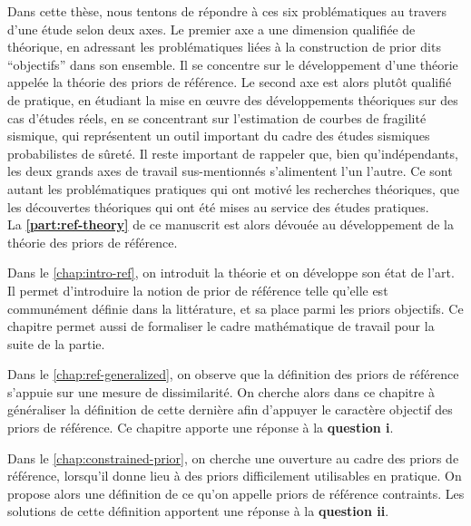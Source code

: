 Dans cette thèse, nous tentons de répondre à ces six problématiques au travers d'une étude selon deux axes. Le premier axe a une dimension qualifiée de théorique, en adressant les problématiques liées à la construction de prior dits ``objectifs'' dans son ensemble. Il se concentre sur le développement d'une théorie appelée la théorie des priors de référence. Le second axe est alors plutôt qualifié de pratique, en étudiant la mise en œuvre des développements théoriques sur des cas d'études réels, en se concentrant sur l'estimation de courbes de fragilité sismique, qui représentent un outil important du cadre des études sismiques probabilistes de sûreté.
Il reste important de rappeler que, bien qu'indépendants, les deux grands axes de travail sus-mentionnés s'alimentent l'un l'autre. Ce sont autant les problématiques pratiques qui ont motivé les recherches théoriques, que les découvertes théoriques qui ont été mises au service des études pratiques.\\






La \textbf{\cref{part:ref-theory}} de ce manuscrit est alors dévouée au développement de la théorie des priors de référence.

\noindent
Dans le \cref{chap:intro-ref}, on introduit la théorie et on développe son état de l'art. Il permet d'introduire la notion de prior de référence telle qu'elle est communément définie dans la littérature, et sa place parmi les priors objectifs. Ce chapitre permet aussi de formaliser le cadre mathématique de travail pour la suite de la partie.

\noindent
Dans le \cref{chap:ref-generalized}, on observe que la définition des priors de référence s'appuie sur une mesure de dissimilarité. On cherche alors dans ce chapitre à généraliser la définition de cette dernière afin d'appuyer le caractère objectif des priors de référence. Ce chapitre apporte une réponse à la \textbf{question i}.

\noindent
Dans le \cref{chap:constrained-prior}, on cherche une ouverture au cadre des priors de référence, lorsqu'il donne lieu à des priors difficilement utilisables en pratique. On propose alors une définition de ce qu'on appelle priors de référence contraints. Les solutions de cette définition apportent une réponse à la \textbf{question ii}.

